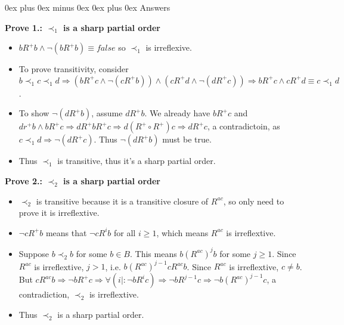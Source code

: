 \documentclass[letterpaper, 8pt]{extarticle}
\makeatletter
\renewcommand{\subsubsection}{\@startsection{subsubsection}{3}{0mm}%
                                {0ex plus 0ex minus 0ex}%
                                {0ex plus 0ex}%
                                {\normalfont\tiny\bfseries}}
\makeatother
\begin{document}
\begin{multicols*}{3}
    \subsubsection{Answers}

    \textbf{Prove 1.: $\prec_1$ is a sharp partial order}

    \begin{itemize}
    \item
        $bR^+b \land \lnot (b R^+ b) \equiv false$ so $\prec_1$ is irreflexive.
    \item
        To prove transitivity, consider $b \prec_1 c \prec_1 d \Rightarrow (bR^+ c \land \lnot (c R^+ b)) \land (c R^+ d \land \lnot (dR^+ c)) \Rightarrow b R^+ c \land c R^+ d \equiv c \prec_1 d$.
    \item
        To show $\lnot (d R^+ b)$, assume $d R^+ b$. We already have $bR^+c$ and $dr^+b \land bR^+c \Rightarrow dR^+ bR^+ c \Rightarrow d(R^+ \circ R^+) c \Rightarrow dR^+c$, a contradictoin, as $c \prec_1 d \Rightarrow \lnot (dR^+ c)$. Thus $\lnot (dR^+b)$ must be true.
    \item
        Thus $\prec_1$ is transitive, thus it's a sharp partial order.
    \end{itemize}

    \textbf{Prove 2.: $\prec_2$ is a sharp partial order}
    \begin{itemize}
        \item
            $\prec_2$ is transitive because it is a transitive closure of $R^{ac}$, so only need to prove it is irreflextive.
        \item
            $\lnot c R^+ b$ means that $\lnot cR^ib$ for all $i \ge 1$, which means $R^{ac}$ is irreflextive.
        \item
            Suppose $b \prec_2 b$ for some $b \in B$. This means $b(R^{ac})^j b$ for some $j \ge 1$. Since $R^{ac}$ is irreflextive, $j > 1$, i.e. $b(R^{ac})^{j-1} cR^{ac} b$. Since $R^{ac}$ is irreflextive, $c \ne b$. But $cR^{ac}b \Rightarrow \lnot b R^+ c \Rightarrow \forall (i \mid : \lnot b R^i c) \Rightarrow \lnot bR^{j-1} c \Rightarrow \lnot b(R^{ac})^{j-1} c$, a contradiction, $\prec_2$ is irreflextive.
        \item
            Thus $\prec_2$ is a sharp partial order.
    \end{itemize}


\end{multicols*}
\end{document}

